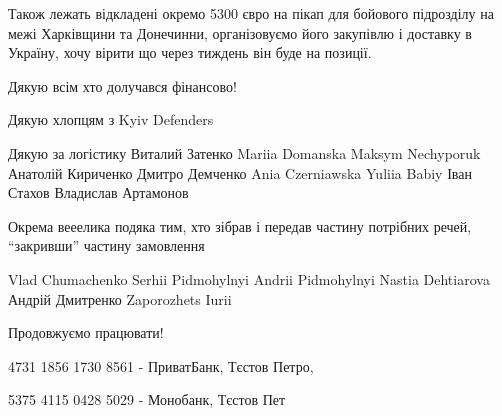Також лежать відкладені окремо 5300 євро на пікап для бойового підрозділу на
межі Харківщини та Донечинни, організовуємо його закупівлю і доставку в
Україну, хочу вірити що через тиждень він буде на позиції. 

Дякую всім хто долучався фінансово!

Дякую хлопцям з Kyiv Defenders 

Дякую за логістику Виталий Затенко Mariia Domanska Maksym Nechyporuk Анатолій
Кириченко  Дмитро Демченко Ania Czerniawska Yuliia Babiy Іван Стахов Владислав
Артамонов

Окрема вееелика подяка тим, хто зібрав і передав частину потрібних речей,
\enquote{закривши} частину замовлення 

Vlad  Chumachenko Serhii Pidmohylnyi Andrii Pidmohylnyi Nastia Dehtiarova
Андрій Дмитренко Zaporozhets Iurii

Продовжуємо працювати! 

4731 1856 1730 8561 - ПриватБанк, Тєстов Петро, 

5375 4115 0428 5029 - Монобанк,  Тєстов Пет
